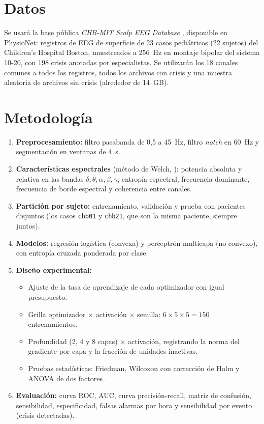 \documentclass[11pt]{article}
\begin{document}
\section{Datos}

Se usará la base pública \emph{CHB-MIT Scalp EEG Database} \parencite{shoeb2009,goldberger2000}, disponible en PhysioNet: registros de EEG de superficie de 23 casos pediátricos (22 sujetos) del Children's Hospital Boston, muestreados a 256~Hz en montaje bipolar del sistema 10-20, con 198 crisis anotadas por especialistas. Se utilizarán los 18 canales comunes a todos los registros, todos los archivos con crisis y una muestra aleatoria de archivos sin crisis (alrededor de 14~GB).

\section{Metodología}

\begin{enumerate}
  \item \textbf{Preprocesamiento:} filtro pasabanda de 0,5 a 45~Hz, filtro \emph{notch} en 60~Hz y segmentación en ventanas de 4~s.
  \item \textbf{Características espectrales} (método de Welch, \cite{welch1967}): potencia absoluta y relativa en las bandas $\delta,\theta,\alpha,\beta,\gamma$, entropía espectral, frecuencia dominante, frecuencia de borde espectral y coherencia entre canales.
  \item \textbf{Partición por sujeto:} entrenamiento, validación y prueba con pacientes disjuntos (los casos \texttt{chb01} y \texttt{chb21}, que son la misma paciente, siempre juntos).
  \item \textbf{Modelos:} regresión logística (convexa) y perceptrón multicapa (no convexo), con entropía cruzada ponderada por clase.
  \item \textbf{Diseño experimental:}
  \begin{itemize}
    \item Ajuste de la tasa de aprendizaje de cada optimizador con igual presupuesto.
    \item Grilla optimizador $\times$ activación $\times$ semilla: $6 \times 5 \times 5 = 150$ entrenamientos.
    \item Profundidad (2, 4 y 8 capas) $\times$ activación, registrando la norma del gradiente por capa y la fracción de unidades inactivas.
    \item Pruebas estadísticas: Friedman, Wilcoxon con corrección de Holm y ANOVA de dos factores \parencite{demsar2006}.
  \end{itemize}
  \item \textbf{Evaluación:} curva ROC, AUC, curva precisión-recall, matriz de confusión, sensibilidad, especificidad, falsas alarmas por hora y sensibilidad por evento (crisis detectadas).
\end{enumerate}
\end{document}
